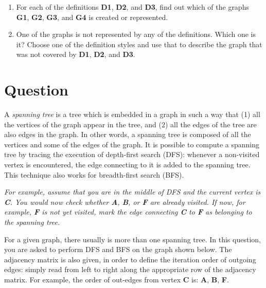 \documentclass[a4paper]{article}
\newcounter{question}
\newcommand{\question}{\refstepcounter{question}\section*{Question~\thequestion}}
\renewcommand*\thequestion{\arabic{question}}
\begin{document}
\begin{enumerate}
\item
  For each of the definitions \textbf{D1}, \textbf{D2}, and \textbf{D3}, find out which of the graphs \textbf{G1}, \textbf{G2}, \textbf{G3}, and \textbf{G4} is created or represented.
\item
  One of the graphs is not represented by any of the definitions.
  Which one is it?
  Choose one of the definition styles and use that to describe the graph that was not covered by \textbf{D1}, \textbf{D2}, and \textbf{D3}.
\end{enumerate}

\clearpage

\question

A \emph{spanning tree} is a tree which is embedded in a graph in such a way that
(1) all the vertices of the graph appear in the tree, and
(2) all the edges of the tree are also edges in the graph.
In other words, a spanning tree is composed of all the vertices and some of the edges of the graph.
It is possible to compute a spanning tree by tracing the execution of depth-first search (DFS):
whenever a non-visited vertex is encountered, the edge connecting to it is added to the spanning tree.
This technique also works for breadth-first search (BFS).

\emph{%
For example, assume that you are in the middle of DFS and the current vertex is \textbf{C}.
You would now check whether \textbf{A}, \textbf{B}, or \textbf{F} are already visited.
If now, for example, \textbf{F} is not yet visited, mark the edge connecting \textbf{C} to \textbf{F} as belonging to the spanning tree.}

For a given graph, there usually is more than one spanning tree.
In this question, you are asked to perform DFS and BFS on the graph shown below.
The adjacency matrix is also given, in order to define the iteration order of outgoing edges:
simply read from left to right along the appropriate row of the adjacency matrix.
For example, the order of out-edges from vertex \textbf{C} is: \textbf{A}, \textbf{B}, \textbf{F}.
\end{document}
